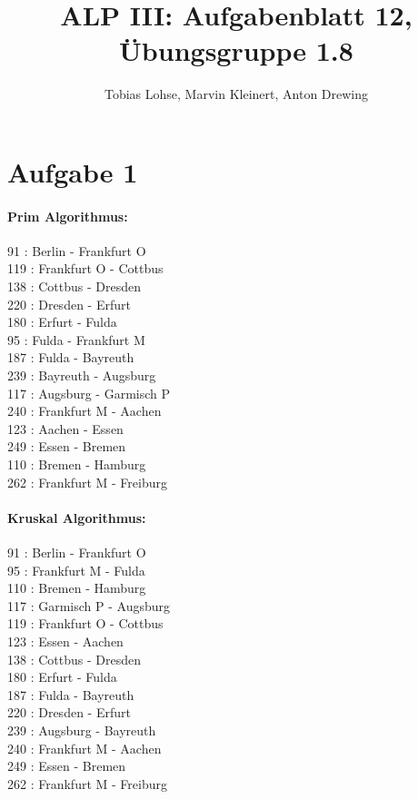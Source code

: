\documentclass[a4paper,11pt]{article}
\title{\vspace{-1.5cm} ALP III: Aufgabenblatt 12, Übungsgruppe 1.8 }
\author {Tobias Lohse, Marvin Kleinert, Anton Drewing}
\date{}
\begin{document}
\maketitle

\section*{Aufgabe 1}

\begin{multicols}{2}
\paragraph{Prim Algorithmus:}$\;$
\\  91 : Berlin - Frankfurt O
\\ 119 : Frankfurt O - Cottbus
\\ 138 : Cottbus - Dresden
\\ 220 : Dresden - Erfurt
\\ 180 : Erfurt - Fulda
\\  95 : Fulda - Frankfurt M
\\ 187 : Fulda - Bayreuth
\\ 239 : Bayreuth - Augsburg
\\ 117 : Augsburg - Garmisch P
\\ 240 : Frankfurt M - Aachen
\\ 123 : Aachen - Essen
\\ 249 : Essen - Bremen
\\ 110 : Bremen - Hamburg
\\ 262 : Frankfurt M - Freiburg

\paragraph{Kruskal Algorithmus:}$\;$
\\  91 : Berlin - Frankfurt O
\\  95 : Frankfurt M - Fulda
\\ 110 : Bremen - Hamburg
\\ 117 : Garmisch P - Augsburg
\\ 119 : Frankfurt O - Cottbus
\\ 123 : Essen - Aachen
\\ 138 : Cottbus - Dresden
\\ 180 : Erfurt - Fulda
\\ 187 : Fulda - Bayreuth
\\ 220 : Dresden - Erfurt
\\ 239 : Augsburg - Bayreuth
\\ 240 : Frankfurt M - Aachen
\\ 249 : Essen - Bremen
\\ 262 : Frankfurt M - Freiburg
\end{multicols}
\end{document}

